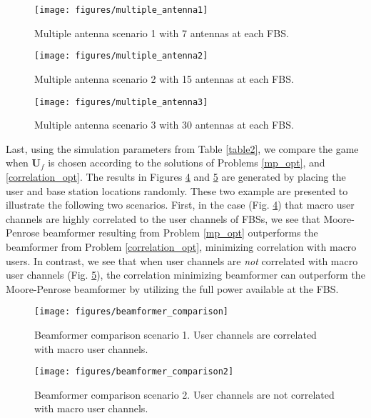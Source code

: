 \begin{figure}[H]
	\texttt{[image: figures/multiple\_antenna1]}
	  \caption{Multiple antenna scenario 1 with 7 antennas at each FBS.}
	  \label{multiple_antenna1}
\end{figure}

\begin{figure}[H]
	\texttt{[image: figures/multiple\_antenna2]}
	  \caption{Multiple antenna scenario 2 with 15 antennas at each FBS.}
	  \label{multiple_antenna2}
\end{figure}

\begin{figure}[H]
	\texttt{[image: figures/multiple\_antenna3]}
	  \caption{Multiple antenna scenario 3 with 30 antennas at each FBS.}
	  \label{multiple_antenna3}
\end{figure}


Last, using the simulation parameters from Table \ref{table2}, we compare the game when $\mathbf{U}_f$ is chosen according to the solutions of Problems \ref{mp_opt}, and \ref{correlation_opt}. The results in Figures \ref{beamformer_comparison} and \ref{beamformer_comparison2} are generated by placing the user and base station locations randomly. These two example are presented to illustrate the following two scenarios. First, in the case (Fig. \ref{beamformer_comparison}) that macro user channels are highly correlated to the user channels of FBSs, we see that Moore-Penrose beamformer resulting from Problem \ref{mp_opt} outperforms the beamformer from Problem \ref{correlation_opt}, minimizing correlation with macro users. In contrast, we see that when user channels are \emph{not} correlated with macro user channels (Fig. \ref{beamformer_comparison2}), the correlation minimizing beamformer can outperform the Moore-Penrose beamformer by utilizing the full power available at the FBS.  

\begin{figure}[H]
	\texttt{[image: figures/beamformer\_comparison]}
	  \caption{Beamformer comparison scenario 1. User channels are correlated with macro user channels.}
	  \label{beamformer_comparison}
\end{figure}

\begin{figure}[H]
	\texttt{[image: figures/beamformer\_comparison2]}
	  \caption{Beamformer comparison scenario 2. User channels are not correlated with macro user channels.}
	  \label{beamformer_comparison2}
\end{figure}



